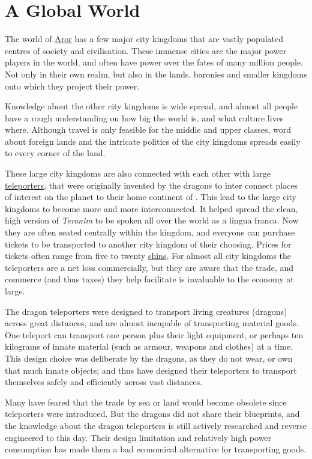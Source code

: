 \section{A Global World}

The world of \hyperref[sec:Aror]{Aror} has a few major city kingdoms that are
vastly populated centres of society and civilisation. These immense cities are
the major power players in the world, and often have power over the fates of
many million people. Not only in their own realm, but also in the lands,
baronies and smaller kingdoms onto which they project their power.

Knowledge about the other city kingdoms is wide spread, and almost all people
have a rough understanding on how big the world is, and what culture lives
where. Although travel is only feasible for the middle and upper classes, word
about foreign lands and the intricate politics of the city kingdoms spreads
easily to every corner of the land.

These large city kingdoms are also connected with each other with large
\hyperref[sec:Dragon Teleporter]{teleporters}, that were originally invented
by the dragons to inter connect places of interest on the planet to their home
continent of . This lead to the large city kingdoms to
become more and more interconnected. It helped spread the clean, high version
of \emph{Teranim} to be spoken all over the world as a lingua franca. Now
they are often seated centrally within the kingdom, and everyone can purchase
tickets to be transported to another city kingdom of their choosing. Prices
for tickets often range from five to twenty \hyperref[sec:Shin]{shins}. For
almost all city kingdoms the teleporters are a net loss commercially, but they
are aware that the trade, and commerce (and thus taxes) they help facilitate is
invaluable to the economy at large.

The dragon teleporters were designed to transport living creatures (dragons)
across great distances, and are almost incapable of transporting material
goods. One teleport can transport one person plus their light equipment, or
perhaps ten kilograms of innate material (such as armour, weapons and
clothes) at a time. This design choice was deliberate by the dragons, as they
do not wear, or own that much innate objects; and thus have designed their
teleporters to transport themselves safely and efficiently across vast
distances.

Many have feared that the trade by sea or land would become obsolete since
teleporters were introduced. But the dragons did not share their blueprints,
and the knowledge about the dragon teleporters is still actively researched
and reverse engineered to this day. Their design limitation and relatively
high power consumption has made them a bad economical alternative for
transporting goods.

